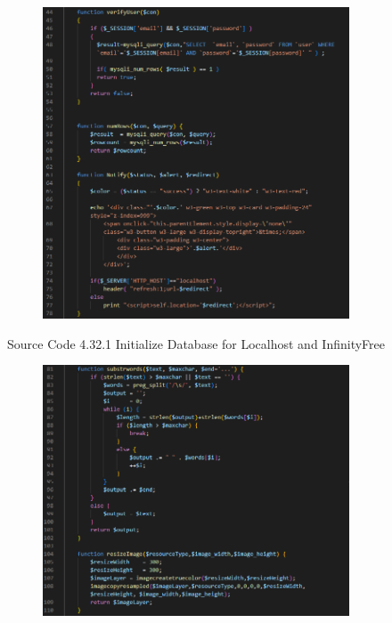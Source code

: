 \begin{enumerate}[1.]
\begin{figure}[h]
\begin{subfigure}[b]{0.6\textwidth}
            \includegraphics[width=\textwidth]{mainmatter/images/backend/alunandb2.png}
            \label{fig:sub2}
        \end{subfigure}
        \caption*{Source Code 4.32.1 Initialize Database for Localhost and InfinityFree}
        \label{fig:myfig71a}
    \end{figure}
    \begin{figure}[h]\ContinuedFloat
        \centering
        \begin{subfigure}[b]{0.8\textwidth}
            \centering
            \includegraphics[width=\textwidth]{mainmatter/images/backend/alunandb3.png}

\end{subfigure}
\end{figure}
\end{enumerate}
